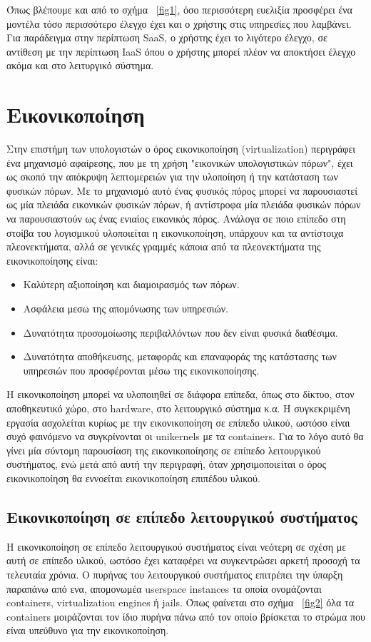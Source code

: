 \newpage
Όπως βλέπουμε και από το σχήμα ~\ref{fig1}, όσο περισσότερη ευελιξία προσφέρει
ένα μοντέλα τόσο περισσότερο έλεγχο έχει και ο χρήστης στις υπηρεσίες που
λαμβάνει. Για παράδειγμα στην περίπτωση SaaS, ο χρήστης έχει το λιγότερο έλεγχο,
σε αντίθεση με την περίπτωση IaaS όπου ο χρήστης μπορεί πλέον να αποκτήσει
έλεγχο ακόμα και στο λειτυργικό σύστημα.

\section{Εικονικοποίηση}

Στην επιστήμη των υπολογιστών ο όρος εικονικοποίηση (virtualization) περιγράφει
ένα μηχανισμό αφαίρεσης, που με τη χρήση "εικονικών υπολογιστικών πόρων", έχει
ως σκοπό την απόκρυψη λεπτομερειών για την υλοποίηση ή την κατάσταση των φυσικών
πόρων. Με το μηχανισμό αυτό ένας φυσικός πόρος μπορεί να παρουσιαστεί ως μία
πλειάδα εικονικών φυσικών πόρων, ή αντίστροφα μία πλειάδα φυσικών πόρων να
παρουσιαστούν ως ένας ενιαίος εικονικός πόρος. Ανάλογα σε ποιο
επίπεδο στη στοίβα του λογισμικού υλοποιείται η εικονικοποίηση, υπάρχουν και τα
αντίστοιχα πλεονεκτήματα, αλλά σε γενικές γραμμές κάποια από τα  πλεονεκτήματα
της εικονικοποίησης είναι:

\begin{itemize}
	\item Καλύτερη αξιοποίηση και διαμοιρασμός των πόρων.
	\item Ασφάλεια μεσω της απομόνωσης των υπηρεσιών.
	\item Δυνατότητα προσομοίωσης περιβαλλόντων που δεν είναι φυσικά
		διαθέσιμα.
	\item Δυνατότητα αποθήκευσης, μεταφοράς και επαναφοράς της κατάστασης
		των υπηρεσιών που προσφέρονται μέσω της εικονικοποίησης.
\end{itemize}

Η εικονικοποίηση μπορεί να υλοποιηθεί σε διάφορα επίπεδα, όπως στο δίκτυο, στον
αποθηκευτικό χώρο, στο hardware, στο λειτουργικό σύστημα κ.α. Η συγκεκριμένη
εργασία ασχολείται κυρίως με την εικονικοποίηση σε επίπεδο υλικού, ωστόσο είναι
συχό φαινόμενο να συγκρίνονται οι unikernels με τα containers. Για το λόγο αυτό
θα γίνει μία σύντομη παρουσίαση της εικονικοποίησης σε επίπεδο λειτουργικού
συστήματος, ενώ μετά από αυτή την περιγραφή, όταν χρησιμοποιείται ο όρος
εικονικοποίηση θα εννοείται εικονικοποίηση επιπέδου υλικού. 

\subsection{Εικονικοποίηση σε επίπεδο λειτουργικού συστήματος}
Η εικονικοποίηση σε επίπεδο λειτουργικού συστήματος είναι νεότερη σε σχέση με
αυτή σε επίπεδο υλικού, ωστόσο έχει καταφέρει να συγκεντρώσει αρκετή προσοχή τα
τελευταία χρόνια. Ο πυρήνας του λειτουργικού συστήματος επιτρέπει την ύπαρξη
παραπάνω από ενα, απομονωμέα userspace instances τα οποία ονομάζονται
containers, virtualization engines ή jails. Όπως φαίνεται στο σχήμα
~\ref{fig2} όλα τα containers μοιράζονται τον
ίδιο πυρήνα πάνω από τον οποίο βρίσκεται το στρώμα που είναι υπεύθυνο για την εικονικοποίηση. 

